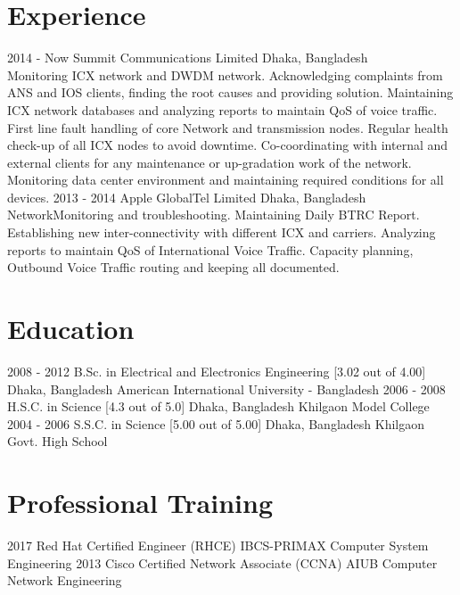 \documentclass[]{cv-style} %
\begin{document}
\section{Experience}
\begin{entrylist}
\entry
  {2014 - Now}
  {Summit Communications Limited}
  {Dhaka, Bangladesh}
  {\\
Monitoring ICX network and DWDM network. Acknowledging complaints from ANS and IOS clients, finding the root causes and providing solution. Maintaining ICX network databases and analyzing reports to maintain QoS of voice traffic. First line fault handling of core Network and transmission nodes. Regular health check-up of all ICX nodes to avoid downtime. Co-coordinating with internal and external clients for any maintenance or up-gradation work of the network. Monitoring data center environment and maintaining required conditions for all devices.}
\entry
  {2013 - 2014}
  {Apple GlobalTel Limited}
  {Dhaka, Bangladesh}
  {\\
Network\jobtitle Monitoring and troubleshooting. Maintaining Daily BTRC Report. Establishing new inter-connectivity with different ICX and carriers. Analyzing reports to maintain QoS of International Voice Traffic. Capacity planning, Outbound Voice Traffic routing and keeping all documented.\\}
\end{entrylist}
\section{Education}
\begin{entrylist}
\entry
{2008 - 2012}
{B.Sc. {\normalfont in Electrical and Electronics Engineering [3.02 out of 4.00]}}
{Dhaka, Bangladesh}
{American International University - Bangladesh}
\entry
{2006 - 2008}
{H.S.C. {\normalfont in Science [4.3 out of 5.0]}}
{Dhaka, Bangladesh}
{Khilgaon Model College}
\entry
{2004 - 2006}
{S.S.C. {\normalfont in Science [5.00 out of 5.00]}}
{Dhaka, Bangladesh}
{Khilgaon Govt. High School}
\end{entrylist} 
\section{Professional Training}
\begin{entrylist}
\entry
{2017}
{Red Hat Certified Engineer (RHCE)}
{IBCS-PRIMAX}
{Computer System Engineering}
\entry
{2013}
{Cisco Certified Network Associate (CCNA)}
{AIUB}
{Computer Network Engineering}
\end{entrylist}
\end{document}

